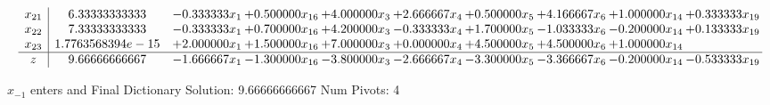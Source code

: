 \documentclass[10pt]{article}
\begin{document}
\[\begin{array}{c| c c@{\hskip 2pt} c@{\hskip 2pt} c@{\hskip 2pt} c@{\hskip 2pt} c@{\hskip 2pt} c@{\hskip 2pt} c@{\hskip 2pt} c@{\hskip 2pt} }
 x_{21}   &  6.33333333333 & -0.333333 x_{1} & + 0.500000 x_{16} & + 4.000000 x_{3} & + 2.666667 x_{4} & + 0.500000 x_{5} & + 4.166667 x_{6} & + 1.000000 x_{14} & + 0.333333 x_{19}\\
 x_{22}   &  7.33333333333 & -0.333333 x_{1} & + 0.700000 x_{16} & + 4.200000 x_{3} & -0.333333 x_{4} & + 1.700000 x_{5} & -1.033333 x_{6} & -0.200000 x_{14} & + 0.133333 x_{19}\\
 x_{23}   &  1.7763568394e-15 & + 2.000000 x_{1} & + 1.500000 x_{16} & + 7.000000 x_{3} & + 0.000000 x_{4} & + 4.500000 x_{5} & + 4.500000 x_{6} & + 1.000000 x_{14} &   \\
\hline
z    &  9.66666666667 & -1.666667 x_{1} & -1.300000 x_{16} & -3.800000 x_{3} & -2.666667 x_{4} & -3.300000 x_{5} & -3.366667 x_{6} & -0.200000 x_{14} & -0.533333 x_{19}\\
\end{array}\]


 $ x_{-1} $ enters and Final Dictionary
Solution:  9.66666666667
Num Pivots:  4
\end{document}
